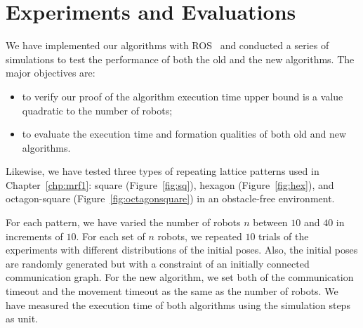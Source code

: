 \section{Experiments and Evaluations}
\label{sec:exp}
We have implemented our algorithms with ROS~\cite{CouGerConGar10} and conducted a series of simulations to test the performance of both the old and the new algorithms. 
%
The major objectives are:
\begin{itemize}
\item to verify our proof of the algorithm execution time upper bound is a value quadratic to the number of robots;
\item to evaluate the execution time and formation qualities of both old and new algorithms.
\end{itemize} 
 
 
Likewise, we have tested three types of repeating lattice patterns used in Chapter~\ref{chp:mrf1}:
square (Figure~\ref{fig:sq}), hexagon (Figure~\ref{fig:hex}), and octagon-square (Figure~\ref{fig:octagonsquare}) in an obstacle-free environment.
  
  
For each pattern, we have varied the number of robots $n$ between $10$ and $40$ in increments of $10$. 
%
For each set of $n$ robots, we repeated $10$ trials of the experiments with different distributions
of the initial poses. 
%
Also, the initial poses are randomly generated but with a constraint of an initially connected communication graph. 
%
For the new algorithm, we set both of the communication timeout and the movement timeout as the same as the number of robots. 
%
We have measured the execution time of both algorithms using the simulation steps as unit. 


